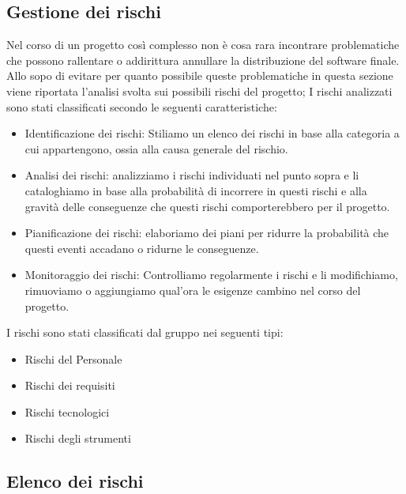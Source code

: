 \documentclass[../piano-di-progetto.tex]{subfiles}
\begin{document}
	\subsection{Gestione dei rischi}%
  \label{sub:gestione_dei_rischi}
  Nel corso di un progetto così complesso non è cosa rara incontrare problematiche che possono rallentare o addirittura annullare la distribuzione del software finale.
  Allo sopo di evitare per quanto possibile queste problematiche in questa sezione viene riportata l'analisi svolta sui possibili rischi del progetto; I rischi analizzati sono stati classificati secondo le seguenti caratteristiche:
  \begin{itemize}
      \item Identificazione dei rischi: Stiliamo un elenco dei rischi in base alla categoria a cui appartengono, ossia alla causa generale del rischio.
      \item Analisi dei rischi: analizziamo i rischi individuati nel punto sopra e li cataloghiamo in base alla probabilità di incorrere in questi rischi e alla gravità delle conseguenze che questi rischi comporterebbero per il progetto.
      \item Pianificazione dei rischi: elaboriamo dei piani per ridurre la probabilità che questi eventi accadano o ridurne le conseguenze.
      \item Monitoraggio dei rischi: Controlliamo regolarmente i rischi e li modifichiamo, rimuoviamo o aggiungiamo qual'ora le esigenze cambino nel corso del progetto.
    \end{itemize}
    I rischi sono stati classificati dal gruppo nei seguenti tipi:
    \begin{itemize}
      \item Rischi del Personale
      \item Rischi dei requisiti
      \item Rischi tecnologici
      \item Rischi degli strumenti
    \end{itemize}

  \subsection{Elenco dei rischi}%
  \label{sub:elenco_dei_rischi}

  
\end{document}
